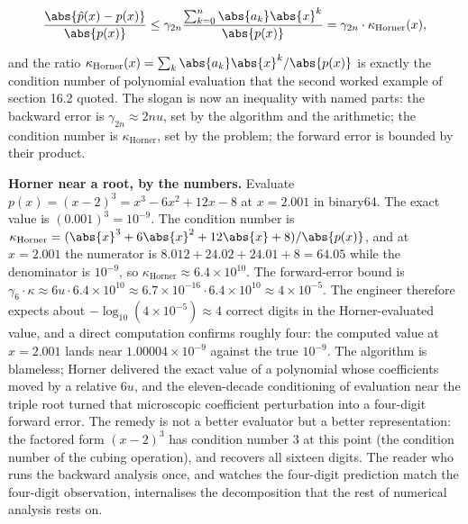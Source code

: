 \[
\frac{\abs{\hat{p}(x) - p(x)}}{\abs{p(x)}} \leq \gamma_{2n}
\frac{\sum_{k=0}^{n} \abs{a_{k}} \abs{x}^{k}}{\abs{p(x)}}
= \gamma_{2n} \cdot \kappa_{\mathrm{Horner}}(x),
\]

and the ratio $\kappa_{\mathrm{Horner}}(x) = \sum_{k} \abs{a_{k}}
\abs{x}^{k} / \abs{p(x)}$ is exactly the condition number of polynomial
evaluation that the second worked example of section 16.2 quoted. The
slogan is now an inequality with named parts: the backward error is
$\gamma_{2n} \approx 2 n u$, set by the algorithm and the arithmetic; the
condition number is $\kappa_{\mathrm{Horner}}$, set by the problem; the
forward error is bounded by their product.

\begin{example}
\textbf{Horner near a root, by the numbers.} Evaluate $p(x) = (x-2)^{3}
= x^{3} - 6 x^{2} + 12 x - 8$ at $x = 2.001$ in binary64. The exact value
is $(0.001)^{3} = 10^{-9}$. The condition number is
$\kappa_{\mathrm{Horner}} = (\abs{x}^{3} + 6\abs{x}^{2} + 12\abs{x} + 8)
/ \abs{p(x)}$, and at $x = 2.001$ the numerator is $8.012 + 24.02 + 24.01
+ 8 = 64.05$ while the denominator is $10^{-9}$, so
$\kappa_{\mathrm{Horner}} \approx 6.4 \times 10^{10}$. The forward-error
bound is $\gamma_{6} \cdot \kappa \approx 6 u \cdot 6.4 \times 10^{10}
\approx 6.7 \times 10^{-16} \cdot 6.4 \times 10^{10} \approx 4 \times
10^{-5}$. The engineer therefore expects about
$-\log_{10}(4 \times 10^{-5}) \approx 4$ correct digits in the
Horner-evaluated value, and a direct computation confirms roughly four:
the computed value at $x = 2.001$ lands near $1.00004 \times 10^{-9}$
against the true $10^{-9}$. The algorithm is blameless; Horner delivered
the exact value of a polynomial whose coefficients moved by a relative
$6 u$, and the eleven-decade conditioning of evaluation near the triple
root turned that microscopic coefficient perturbation into a four-digit
forward error. The remedy is not a better evaluator but a better
representation: the factored form $(x - 2)^{3}$ has condition number $3$
at this point (the condition number of the cubing operation), and recovers
all sixteen digits. The reader who runs the backward analysis once, and
watches the four-digit prediction match the four-digit observation,
internalises the decomposition that the rest of numerical analysis rests
on.
\end{example}

